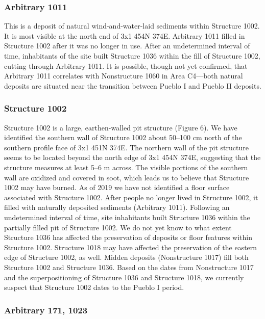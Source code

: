 \documentclass[
  12pt,
]{krantz}
\begin{document}
\hypertarget{arbitrary-1011}{%
\subsubsection{Arbitrary 1011}\label{arbitrary-1011}}

This is a deposit of natural wind-and-water-laid sediments within
Structure 1002. It is most visible at the north end of 3x1 454N 374E.
Arbitrary 1011 filled in Structure 1002 after it was no longer in use.
After an undetermined interval of time, inhabitants of the site built
Structure 1036 within the fill of Structure 1002, cutting through
Arbitrary 1011. It is possible, though not yet confirmed, that Arbitrary
1011 correlates with Nonstructure 1060 in Area C4---both natural
deposits are situated near the transition between Pueblo I and Pueblo II
deposits.

\hypertarget{structure-1002}{%
\subsubsection{Structure 1002}\label{structure-1002}}

Structure 1002 is a large, earthen-walled pit structure (Figure 6). We
have identified the southern wall of Structure 1002 about 50--100 cm
north of the southern profile face of 3x1 451N 374E. The northern wall
of the pit structure seems to be located beyond the north edge of 3x1
454N 374E, suggesting that the structure measures at least 5--6 m
across. The visible portions of the southern wall are oxidized and
covered in soot, which leads us to believe that Structure 1002 may have
burned. As of 2019 we have not identified a floor surface associated
with Structure 1002. After people no longer lived in Structure 1002, it
filled with naturally deposited sediments (Arbitrary 1011). Following an
undetermined interval of time, site inhabitants built Structure 1036
within the partially filled pit of Structure 1002. We do not yet know to
what extent Structure 1036 has affected the preservation of deposits or
floor features within Structure 1002. Structure 1018 may have affected
the preservation of the eastern edge of Structure 1002, as well. Midden
deposits (Nonstructure 1017) fill both Structure 1002 and Structure
1036. Based on the dates from Nonstructure 1017 and the superpositioning
of Structure 1036 and Structure 1018, we currently suspect that
Structure 1002 dates to the Pueblo I period.

\hypertarget{arbitrary-171-1023}{%
\subsubsection{Arbitrary 171, 1023}\label{arbitrary-171-1023}}
\end{document}
